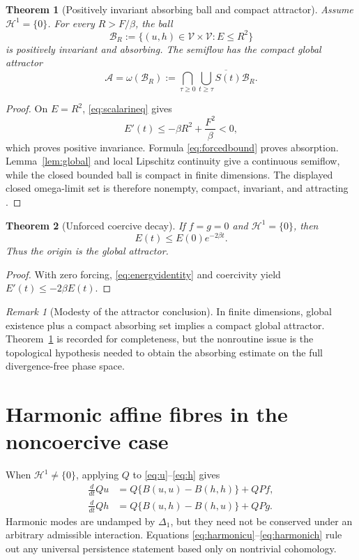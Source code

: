 \documentclass[11pt]{article}
\newtheorem{theorem}{Theorem}
\theoremstyle{remark}
\newtheorem{remark}{Remark}
\begin{document}
\begin{theorem}[Positively invariant absorbing ball and compact attractor]\label{thm:attractor}
Assume $\mathcal H^1=\{0\}$. For every $R>F/\beta$, the ball
\[
\mathcal B_R:=\{(u,h)\in\mathcal V\times\mathcal V:E\leq R^2\}
\]
is positively invariant and absorbing. The semiflow has the compact global attractor
\[
\mathcal A=\omega(\mathcal B_R):=\bigcap_{\tau\geq0}\overline{\bigcup_{t\geq\tau}S(t)\mathcal B_R}.
\]
\end{theorem}

\begin{proof}
On $E=R^2$, \eqref{eq:scalarineq} gives
\[
E'(t)\leq-\beta R^2+\frac{F^2}{\beta}<0,
\]
which proves positive invariance. Formula \eqref{eq:forcedbound} proves absorption. Lemma~\ref{lem:global} and local Lipschitz continuity give a continuous semiflow, while the closed bounded ball is compact in finite dimensions. The displayed closed omega-limit set is therefore nonempty, compact, invariant, and attracting \cite{Temam1997,ConstantinFoias1988}.
\end{proof}

\begin{theorem}[Unforced coercive decay]\label{thm:unforced}
If $f=g=0$ and $\mathcal H^1=\{0\}$, then
\[
E(t)\leq E(0)e^{-2\beta t}.
\]
Thus the origin is the global attractor.
\end{theorem}

\begin{proof}
With zero forcing, \eqref{eq:energyidentity} and coercivity yield $E'(t)\leq-2\beta E(t)$.
\end{proof}

\begin{remark}[Modesty of the attractor conclusion]
In finite dimensions, global existence plus a compact absorbing set implies a compact global attractor. Theorem~\ref{thm:attractor} is recorded for completeness, but the nonroutine issue is the topological hypothesis needed to obtain the absorbing estimate on the full divergence-free phase space.
\end{remark}

\section{Harmonic affine fibres in the noncoercive case}\label{sec:topology}

When $\mathcal H^1\neq\{0\}$, applying $Q$ to \eqref{eq:u}--\eqref{eq:h} gives
\begin{align}
\frac{d}{dt}Qu&=Q\bigl\{B(u,u)-B(h,h)\bigr\}+QPf,\label{eq:harmonicu}\\
\frac{d}{dt}Qh&=Q\bigl\{B(u,h)-B(h,u)\bigr\}+QPg.\label{eq:harmonich}
\end{align}
Harmonic modes are undamped by $\Delta_1$, but they need not be conserved under an arbitrary admissible interaction. Equations \eqref{eq:harmonicu}--\eqref{eq:harmonich} rule out any universal persistence statement based only on nontrivial cohomology.
\end{document}
